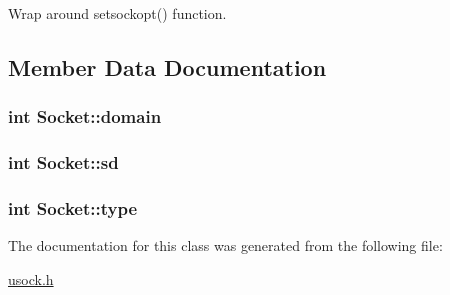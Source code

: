 Wrap around setsockopt() function. 



\subsection{Member Data Documentation}
\hypertarget{classSocket_8b042d9fe02795041a5e045604c8b7ec}{
\subsubsection[{domain}]{\setlength{\rightskip}{0pt plus 5cm}int {\bf Socket::domain}}}
\label{classSocket_8b042d9fe02795041a5e045604c8b7ec}


\hypertarget{classSocket_d9e40b6c9a69e0168c27962cc6c60ef7}{
\subsubsection[{sd}]{\setlength{\rightskip}{0pt plus 5cm}int {\bf Socket::sd}}}
\label{classSocket_d9e40b6c9a69e0168c27962cc6c60ef7}


\hypertarget{classSocket_c7f6980f36023df2004271c336217cb8}{
\subsubsection[{type}]{\setlength{\rightskip}{0pt plus 5cm}int {\bf Socket::type}}}
\label{classSocket_c7f6980f36023df2004271c336217cb8}




The documentation for this class was generated from the following file:\begin{CompactItemize}
\item 
\hyperlink{usock_8h}{usock.h}\end{CompactItemize}

